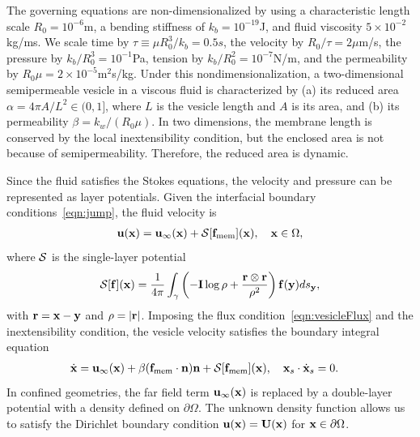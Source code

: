 \documentclass[9pt,twocolumn,twoside,lineno]{pnas-new}
\begin{document}

The governing equations are non-dimensionalized by using a
characteristic length scale $R_0 = 10^{-6}$m, a bending stiffness of
$k_b = 10^{-19}$J, and fluid viscosity $5 \times 10^{-2}$kg/ms. We scale
time by $\tau\equiv\mu R_0^3/k_b = 0.5s$, the velocity by $R_0/\tau =
2\mu$m/s, the pressure by $k_b/R_0^3 = 10^{-1}$Pa, tension by $k_b/R_0^2
= 10^{-7}$N/m, and the permeability by $R_0\mu = 2 \times
10^{-5}$m$^2$s/kg. Under this nondimensionalization, a two-dimensional
semipermeable vesicle in a viscous fluid is characterized by (a) its
reduced area $\alpha = 4\pi A/L^2 \in (0,1]$, where $L$ is the vesicle
length and $A$ is its area, and (b) its permeability $\beta =
k_w/(R_0\mu)$. In two dimensions, the membrane length is conserved by
the local inextensibility condition, but the enclosed area is not
because of semipermeability. Therefore, the reduced area is dynamic.

Since the fluid satisfies the Stokes equations, the velocity and
pressure can be represented as layer potentials. Given the interfacial
boundary conditions~\eqref{eqn:jump}, the fluid velocity is
\begin{align}
  \mathbf{u}(\mathbf{x}) = \mathbf{u}_\infty(\mathbf{x}) + \mathcal{S}[\mathbf{f}_\mathrm{mem}](\mathbf{x}), \quad
    \mathbf{x} \in \Omega,
\end{align}
where $\mathcal{S}$ is the single-layer potential
\begin{align}
  \mathcal{S}[\mathbf{f}](\mathbf{x}) = \frac{1}{4\pi} \int_{\gamma} \left(
    -\mathbf{I} \log\rho + \frac{\mathbf{r} \otimes \mathbf{r}}{\rho^2} \right)
    \mathbf{f}(\mathbf{y}) ds_{\mathbf{y}},
\end{align}
with $\mathbf{r} = \mathbf{x} - \mathbf{y}$ and $\rho = |\mathbf{r}|$. Imposing the flux
condition~\eqref{eqn:vesicleFlux} and the inextensibility condition, the
vesicle velocity satisfies the boundary integral equation
\begin{align}
  \label{eqn:vesVelocity}
  \dot{\mathbf{x}} &= \mathbf{u}_\infty(\mathbf{x}) + \beta (\mathbf{f}_\mathrm{mem}\cdot\mathbf{n})\mathbf{n}
  + \mathcal{S} [\mathbf{f}_\mathrm{mem}](\mathbf{x}),  \quad
  \mathbf{x}_s \cdot \dot{\mathbf{x}}_s = 0.
\end{align}
In confined geometries, the far field term $\mathbf{u}_\infty(\mathbf{x})$ is replaced
by a double-layer potential with a density defined on $\partial\Omega$.
The unknown density function allows us to satisfy the Dirichlet boundary
condition $\mathbf{u}(\mathbf{x}) = \mathbf{U}(\mathbf{x})$ for $\mathbf{x} \in \partial\Omega$.
\end{document}
